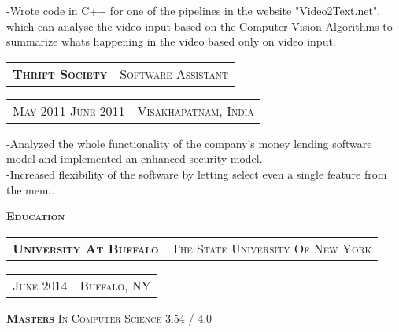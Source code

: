 \documentclass[10pt,letterpaper,oneside]{article}
\begin{document}
    \begin{adjustwidth}{7pt}{0pt}
        {\footnotesize -Wrote code in C++ for one of the pipelines in the website "Video2Text.net", which can analyse 
        the video input based on the Computer Vision Algorithms to
        summarize whats happening in the video based only on video input.}\\
    \end{adjustwidth}
    \vspace{-2mm}
    \begin{tabular}{c|c}
        \textbf{\normalsize T\textsc{hrift} S\textsc{ociety}}
        &\textmd{\normalsize S\textsc{oftware} A\textsc{ssistant}}
    \end{tabular}
    \hspace{2.55in}
    \textcolor{light-gray}{
        \begin{tabular}{c|c}
            {\small M\textsc{ay 2011}-J\textsc{une 2011}}
            &{\small V\textsc{isakhapatnam}, I\textsc{ndia}}
        \end{tabular}
    } 
    \vspace{-4mm}
    \begin{adjustwidth}{7pt}{0pt}
        {\footnotesize -Analyzed the whole functionality of the company's money lending software model and implemented an enhanced security
        model.\\
    -Increased flexibility of the software by letting select even a single feature from the menu.}\\
    \end{adjustwidth}
    \vspace{-7pt}
    \textcolor{light-gray}{\textbf{\large E\textsc{ducation}}}
    \vspace{3pt}\\
    \begin{tabular}{c|c}
        \textbf{\normalsize U\textsc{niversity} A\textsc{t} B\textsc{uffalo}}
        &{\small T\textsc{he} S\textsc{tate} U\textsc{niversity} O\textsc{f} N\textsc{ew} Y\textsc{ork}}
    \end{tabular}
    \hspace{2.58in}
    \begin{tabular}{c|c}
        \textcolor{light-gray}{{\small J\textsc{une} 2014}}
        &\textcolor{light-gray}{{\small B\textsc{uffalo}, NY}}\\
    \end{tabular}
    \begin{adjustwidth}{6pt}{0pt}
        {\small \textbf{M\textsc{asters}} I\textsc{n} C\textsc{omputer} S\textsc{cience} }
        \hspace{5.33in}
        \textcolor{light-gray}{{\small 3.54 / 4.0}}
    \end{adjustwidth}
\end{document}
